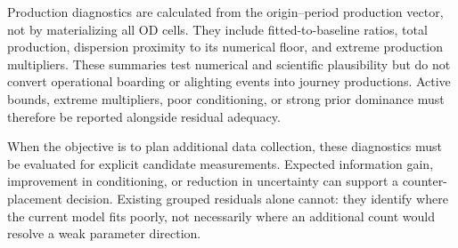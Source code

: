 Production diagnostics are calculated from the origin--period production
vector, not by materializing all OD cells. They include fitted-to-baseline
ratios, total production, dispersion proximity to its numerical floor, and
extreme production multipliers. These summaries test numerical and scientific
plausibility but do not convert operational boarding or alighting events into
journey productions. Active bounds, extreme multipliers, poor conditioning,
or strong prior dominance must therefore be reported alongside residual
adequacy.

When the objective is to plan additional data collection, these diagnostics
must be evaluated for explicit candidate measurements. Expected information
gain, improvement in conditioning, or reduction in uncertainty can support a
counter-placement decision. Existing grouped residuals alone cannot: they
identify where the current model fits poorly, not necessarily where an
additional count would resolve a weak parameter direction.
